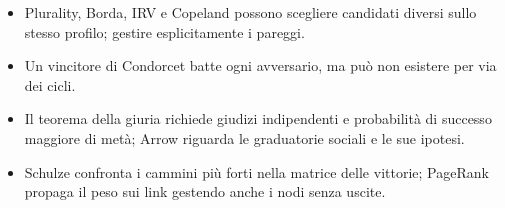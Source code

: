 \begin{riepilogo}
\begin{itemize}
\item Plurality, Borda, IRV e Copeland possono scegliere candidati diversi sullo stesso profilo; gestire esplicitamente i pareggi.
\item Un vincitore di Condorcet batte ogni avversario, ma può non esistere per via dei cicli.
\item Il teorema della giuria richiede giudizi indipendenti e probabilità di successo maggiore di metà; Arrow riguarda le graduatorie sociali e le sue ipotesi.
\item Schulze confronta i cammini più forti nella matrice delle vittorie; PageRank propaga il peso sui link gestendo anche i nodi senza uscite.
\end{itemize}
\end{riepilogo}
